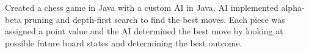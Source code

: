 \documentclass[letterpaper]{deedy-resume-modified} %
\begin{document}
\begin{minipage}[t]{0.66\textwidth}


Created a chess game in Java with a custom AI in Java.   AI implemented alpha-beta pruning and depth-first search to find the best moves.  Each piece was assigned a point value and the AI determined the best move by looking at possible future board states and determining the best outcome.


\sectionspace %

\end{minipage} %

\end{document}
